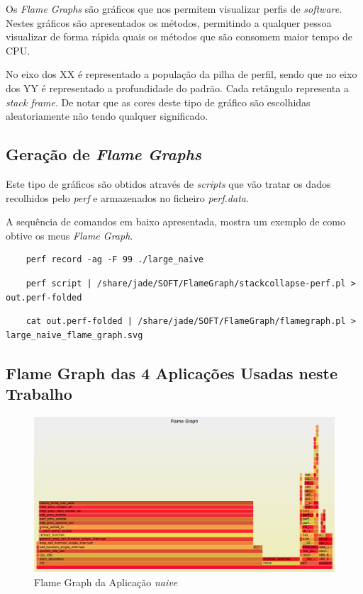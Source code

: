 \documentclass[conference,compsoc]{IEEEtran}
\begin{document}
Os \textit{Flame Graphs}\cite{flame} são gráficos que nos permitem visualizar perfis de \textit{software}. Nestes gráficos são apresentados os métodos, permitindo a qualquer pessoa visualizar de forma rápida quais os métodos que são consomem maior tempo de CPU.

No eixo dos XX é representado a população da pilha de perfil, sendo que no eixo dos YY é representado a profundidade do padrão. Cada retângulo representa a \textit{stack frame}. De notar que as cores deste tipo de gráfico são escolhidas aleatoriamente não tendo qualquer significado.

\subsection{Geração de \textit{Flame Graphs}}

Este tipo de gráficos são obtidos através de \textit{scripts} que vão tratar os dados recolhidos pelo \textit{perf} e armazenados no ficheiro \textit{perf.data}.

A sequência de comandos em baixo apresentada, mostra um exemplo de como obtive os meus \textit{Flame Graph}.

\begin{lstlisting}
	perf record -ag -F 99 ./large_naive
\end{lstlisting}

\begin{lstlisting}
	perf script | /share/jade/SOFT/FlameGraph/stackcollapse-perf.pl > out.perf-folded
\end{lstlisting}

\begin{lstlisting}
	cat out.perf-folded | /share/jade/SOFT/FlameGraph/flamegraph.pl > large_naive_flame_graph.svg
\end{lstlisting}

\subsection{Flame Graph das 4 Aplicações Usadas neste Trabalho}

\begin{figure}[h!]
\centering
\includegraphics[scale=0.2]{flame_graph_naive.png}
\caption{Flame Graph da Aplicação \textit{naive}}
\end{figure}
\end{document}
